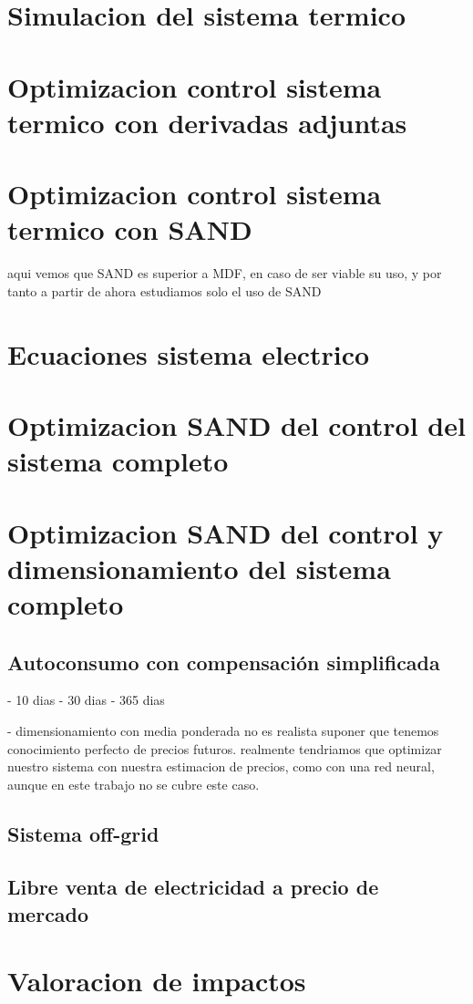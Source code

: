 \section{Simulacion del sistema termico}

\section{Optimizacion control sistema termico con derivadas adjuntas}

\section{Optimizacion control sistema termico con SAND}

aqui vemos que SAND es superior a MDF, en caso de ser viable su uso,
y por tanto a partir de ahora estudiamos solo el uso de SAND

\section{Ecuaciones sistema electrico}

\section{Optimizacion SAND del control del sistema completo}
\section{Optimizacion SAND del control y dimensionamiento del sistema completo}
\subsection{Autoconsumo con compensación simplificada}
- 10 dias
- 30 dias
- 365 dias

- dimensionamiento con media ponderada
no es realista suponer que tenemos conocimiento perfecto de precios futuros.
realmente tendriamos que optimizar nuestro sistema con nuestra estimacion
de precios, como con una red neural, aunque en este trabajo no se cubre este caso.
\subsection{Sistema off-grid}
\subsection{Libre venta de electricidad a precio de mercado}

\section{Valoracion de impactos}
